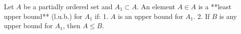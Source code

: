 Let $A$ be a partially ordered set and $A_1 \subset A$. An element $A \in A$ is a **least upper bound** (l.u.b.) for $A_1$ if:
1. $A$ is an upper bound for $A_1$.
2. If $B$ is any upper bound for $A_1$, then $A \leq B$.
